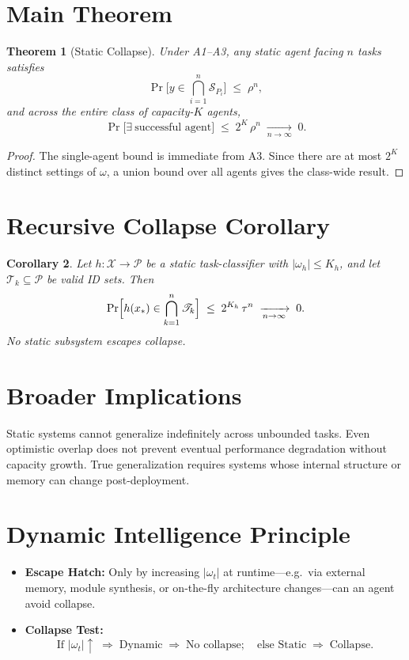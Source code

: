 \documentclass{article}
\newcommand{\Pcal}{\mathscr{P}}
\newcommand{\Scal}{\mathscr{S}}
\newcommand{\Tcal}{\mathscr{T}}
\newtheorem{theorem}{Theorem}[section]
\newtheorem{corollary}[theorem]{Corollary}
\begin{document}
\section{Main Theorem}
\begin{theorem}[Static Collapse]
Under A1–A3, any static agent facing $n$ tasks satisfies
\[
  \Pr\bigl[y \in \bigcap_{i=1}^n \Scal_{P_i}\bigr] \;\le\; \rho^n,
\]
and across the entire class of capacity-$K$ agents,
\[
  \Pr\bigl[\exists\ \text{successful agent}\bigr] \;\le\; 2^K\,\rho^n
  \;\xrightarrow[n\to\infty]{}\;0.
\]
\end{theorem}
\begin{proof}
The single-agent bound is immediate from A3.  Since there are at most $2^K$ distinct settings of $\omega$, a union bound over all agents gives the class-wide result.
\end{proof}

\section{Recursive Collapse Corollary}
\begin{corollary}
Let $h\colon\mathcal{X}\to\Pcal$ be a static task-classifier with $|\omega_h|\le K_h$, and let $\Tcal_k\subseteq\Pcal$ be valid ID sets.  Then
\[
  \Pr\Bigl[h(x_*)\in\bigcap_{k=1}^n\Tcal_k\Bigr]
  \;\le\;2^{K_h}\,\tau^n
  \;\xrightarrow[n\to\infty]{}\;0.
\]
No static subsystem escapes collapse.
\end{corollary}

\section{Broader Implications}
Static systems cannot generalize indefinitely across unbounded tasks.  Even optimistic overlap does not prevent eventual performance degradation without capacity growth.  True generalization requires systems whose internal structure or memory can change post-deployment.

\section{Dynamic Intelligence Principle}
\begin{itemize}
  \item \textbf{Escape Hatch:}  
    Only by increasing $|\omega_t|$ at runtime—e.g.\ via external memory, module synthesis, or on-the-fly architecture changes—can an agent avoid collapse.
  \item \textbf{Collapse Test:}  
    \[
      \text{If }|\omega_t|\uparrow \;\Rightarrow\;\text{Dynamic}\;\Rightarrow\;\text{No collapse};\quad
      \text{else Static}\;\Rightarrow\;\text{Collapse.}
    \]
\end{itemize}
\end{document}

